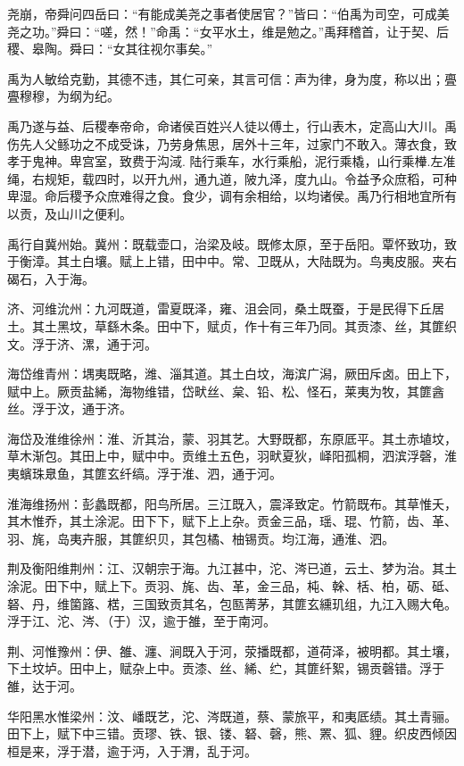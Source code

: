 \documentclass[UTF8,12pt,AutoFakeBold,fontset=fandol]{ctexart}
\begin{document}
	尧崩，帝舜问四岳曰：“有能成美尧之事者使居官？”皆曰：“伯禹为司空，可成美尧之功。”舜曰：“嗟，然！”命禹：“女平水土，维是勉之。”禹拜稽首，让于契、后稷、皋陶。舜曰：“女其往视尔事矣。”
	
	禹为人敏给克勤，其德不违，其仁可亲，其言可信：声为律，身为度，称以出；亹亹穆穆，为纲为纪。
	
	禹乃遂与益、后稷奉帝命，命诸侯百姓兴人徒以傅土，行山表木，定高山大川。禹伤先人父鲧功之不成受诛，乃劳身焦思，居外十三年，过家门不敢入。薄衣食，致孝于鬼神。卑宫室，致费于沟淢. 陆行乘车，水行乘船，泥行乘橇，山行乘檋.左准绳，右规矩，载四时，以开九州，通九道，陂九泽，度九山。令益予众庶稻，可种卑湿。命后稷予众庶难得之食。食少，调有余相给，以均诸侯。禹乃行相地宜所有以贡，及山川之便利。
	
	禹行自冀州始。冀州：既载壶口，治梁及岐。既修太原，至于岳阳。覃怀致功，致于衡漳。其土白壤。赋上上错，田中中。常、卫既从，大陆既为。鸟夷皮服。夹右碣石，入于海。
	
	济、河维沇州：九河既道，雷夏既泽，雍、沮会同，桑土既蚕，于是民得下丘居土。其土黑坟，草繇木条。田中下，赋贞，作十有三年乃同。其贡漆、丝，其篚织文。浮于济、漯，通于河。
	
	海岱维青州：堣夷既略，潍、淄其道。其土白坟，海滨广潟，厥田斥卤。田上下，赋中上。厥贡盐絺，海物维错，岱畎丝、枲、铅、松、怪石，莱夷为牧，其篚酓丝。浮于汶，通于济。
	
	海岱及淮维徐州：淮、沂其治，蒙、羽其艺。大野既都，东原厎平。其土赤埴坟，草木渐包。其田上中，赋中中。贡维土五色，羽畎夏狄，峄阳孤桐，泗滨浮磬，淮夷蠙珠臮鱼，其篚玄纤缟。浮于淮、泗，通于河。
	
	淮海维扬州：彭蠡既都，阳鸟所居。三江既入，震泽致定。竹箭既布。其草惟夭，其木惟乔，其土涂泥。田下下，赋下上上杂。贡金三品，瑶、琨、竹箭，齿、革、羽、旄，岛夷卉服，其篚织贝，其包橘、柚锡贡。均江海，通淮、泗。
	
	荆及衡阳维荆州：江、汉朝宗于海。九江甚中，沱、涔已道，云土、梦为治。其土涂泥。田下中，赋上下。贡羽、旄、齿、革，金三品，杶、榦、栝、柏，砺、砥、砮、丹，维箘簬、楛，三国致贡其名，包匦菁茅，其篚玄纁玑组，九江入赐大龟。浮于江、沱、涔、（于）汉，逾于雒，至于南河。
	
	荆、河惟豫州：伊、雒、瀍、涧既入于河，荥播既都，道荷泽，被明都。其土壤，下土坟垆。田中上，赋杂上中。贡漆、丝、絺、纻，其篚纤絮，锡贡磬错。浮于雒，达于河。
	
	华阳黑水惟梁州：汶、嶓既艺，沱、涔既道，蔡、蒙旅平，和夷厎绩。其土青骊。田下上，赋下中三错。贡璆、铁、银、镂、砮、磬，熊、罴、狐、貍。织皮西倾因桓是来，浮于潜，逾于沔，入于渭，乱于河。
	
\end{document}
